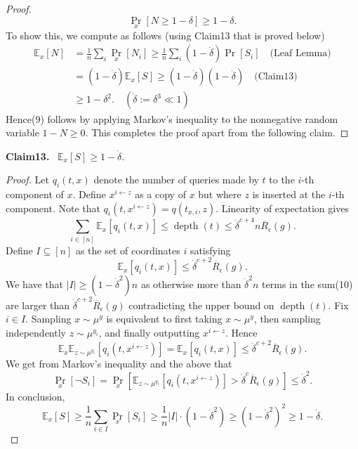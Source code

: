 \documentclass[10pt,a4paper]{article}
\newenvironment{authorclaim}[1]{\par\medskip\noindent\textbf{#1.}\ }{\par\medskip}
\begin{document}
\begin{proof}
\begin{equation}\tag{9}\Pr_x[N\ge1-\delta]\ge1-\delta.\end{equation}
To show this, we compute as follows (using Claim13 that is proved below)
\begin{align*}
\mathbb E_x[N]&=\frac1n\sum_i\Pr_x[N_i]\ge\frac1n\sum_i(1-\dot\delta)\Pr[S_i]\quad\text{(Leaf Lemma)}\\
&=(1-\dot\delta)\mathbb E_x[S]\ge(1-\dot\delta)(1-\dot\delta)\quad\text{(Claim13)}\\
&\ge1-\delta^2.\quad(\dot\delta:=\delta^3\ll1)
\end{align*}
Hence(9) follows by applying Markov's inequality to the nonnegative random variable $1-N\ge0$. This completes the proof apart from the following claim.
\end{proof}
\begin{authorclaim}{Claim13}
$\mathbb E_x[S]\ge1-\dot\delta$.
\end{authorclaim}
\begin{proof}
Let $q_i(t,x)$ denote the number of queries made by $t$ to the $i$-th component of $x$. Define $x^{i\leftarrow z}$ as a copy of $x$ but where $z$ is inserted at the $i$-th component. Note that $q_i(t,x^{i\leftarrow z})=q(t_{x,i},z)$. Linearity of expectation gives
\begin{equation}\tag{10}\sum_{i\in[n]}\mathbb E_x[q_i(t,x)]\le\operatorname{depth}(t)\le\dot\delta^{c+4}n\overline R_\epsilon(g).\end{equation}
Define $I\subseteq[n]$ as the set of coordinates $i$ satisfying
\begin{equation}\tag{11}\mathbb E_x[q_i(t,x)]\le\dot\delta^{c+2}\overline R_\epsilon(g).\end{equation}
We have that $|I|\ge(1-\dot\delta^2)n$ as otherwise more than $\dot\delta^2n$ terms in the sum(10) are larger than $\dot\delta^{c+2}\overline R_\epsilon(g)$ contradicting the upper bound on $\operatorname{depth}(t)$. Fix $i\in I$. Sampling $x\sim\mu^y$ is equivalent to first taking $x\sim\mu^y$, then sampling independently $z\sim\mu^{y_i}$, and finally outputting $x^{i\leftarrow z}$. Hence
\[\mathbb E_x\mathbb E_{z\sim\mu^{y_i}}[q_i(t,x^{i\leftarrow z})]=\mathbb E_x[q_i(t,x)]\le\dot\delta^{c+2}\overline R_\epsilon(g).\]
We get from Markov's inequality and the above that
\begin{equation}\tag{12}\Pr_x[\neg S_i]=\Pr_x\left[\mathbb E_{z\sim\mu^{y_i}}[q_i(t,x^{i\leftarrow z})]>\dot\delta^c\overline R_\epsilon(g)\right]\le\dot\delta^2.\end{equation}
In conclusion,
\[\mathbb E_x[S]\ge\frac1n\sum_{i\in I}\Pr_x[S_i]\ge\frac1n|I|\cdot(1-\dot\delta^2)\ge(1-\dot\delta^2)^2\ge1-\dot\delta.\]
\end{proof}
\end{document}
